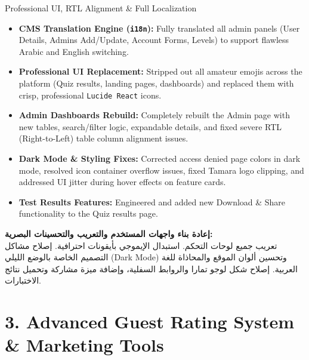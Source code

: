 \documentclass[11pt,a4paper]{article}
\begin{document}
\begin{topicbox}{Professional UI, RTL Alignment \& Full Localization}
\begin{itemize}[leftmargin=*]
\item \textbf{CMS Translation Engine (\texttt{i18n}):} Fully translated all admin panels (User Details, Admins Add/Update, Account Forms, Levels) to support flawless Arabic and English switching.
\item \textbf{Professional UI Replacement:} Stripped out all amateur emojis across the platform (Quiz results, landing pages, dashboards) and replaced them with crisp, professional \texttt{Lucide React} icons.
\item \textbf{Admin Dashboards Rebuild:} Completely rebuilt the Admin page with new tables, search/filter logic, expandable details, and fixed severe RTL (Right-to-Left) table column alignment issues.
\item \textbf{Dark Mode \& Styling Fixes:} Corrected access denied page colors in dark mode, resolved icon container overflow issues, fixed Tamara logo clipping, and addressed UI jitter during hover effects on feature cards.
\item \textbf{Test Results Features:} Engineered and added new Download \& Share functionality to the Quiz results page.
\end{itemize}
\end{topicbox}
\begin{arabicbox}
\textbf{\textarabic{إعادة بناء واجهات المستخدم والتعريب والتحسينات البصرية:}}\\
\textarabic{تعريب جميع لوحات التحكم. استبدال الإيموجي بأيقونات احترافية. إصلاح مشاكل التصميم الخاصة بالوضع الليلي} (\textenglish{Dark Mode}) \textarabic{وتحسين ألوان الموقع والمحاذاة للغة العربية. إصلاح شكل لوجو تمارا والروابط السفلية، وإضافة ميزة مشاركة وتحميل نتائج الاختبارات.}
\end{arabicbox}

\section{3. Advanced Guest Rating System \& Marketing Tools}
\end{document}
